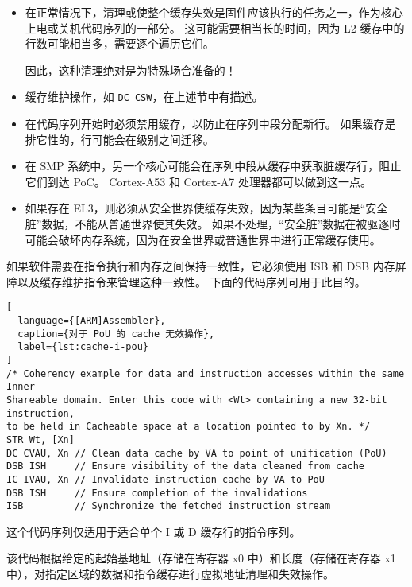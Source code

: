 \begin{itemize}
  \item 在正常情况下，清理或使整个缓存失效是固件应该执行的任务之一，作为核心上电或关机代码序列的一部分。
  这可能需要相当长的时间，因为 L2 缓存中的行数可能相当多，需要逐个遍历它们。

    因此，这种清理绝对是为特殊场合准备的！
  \item 缓存维护操作，如 \lstinline!DC CSW!，在上述节中有描述。
  \item 在代码序列开始时必须禁用缓存，以防止在序列中段分配新行。
  如果缓存是排它性的，行可能会在级别之间迁移。
  \item 在 SMP 系统中，另一个核心可能会在序列中段从缓存中获取脏缓存行，阻止它们到达 PoC。
  Cortex-A53 和 Cortex-A7 处理器都可以做到这一点。
  \item 如果存在 EL3，则必须从安全世界使缓存失效，因为某些条目可能是“安全脏”数据，不能从普通世界使其失效。
  如果不处理，“安全脏”数据在被驱逐时可能会破坏内存系统，因为在安全世界或普通世界中进行正常缓存使用。
\end{itemize}

如果软件需要在指令执行和内存之间保持一致性，它必须使用 ISB 和 DSB 内存屏障以及缓存维护指令来管理这种一致性。
下面的代码序列可用于此目的。

\begin{lstlisting}[
  language={[ARM]Assembler},
  caption={对于 PoU 的 cache 无效操作},
  label={lst:cache-i-pou}
]
/* Coherency example for data and instruction accesses within the same Inner
Shareable domain. Enter this code with <Wt> containing a new 32-bit instruction,
to be held in Cacheable space at a location pointed to by Xn. */
STR Wt, [Xn]
DC CVAU, Xn // Clean data cache by VA to point of unification (PoU)
DSB ISH     // Ensure visibility of the data cleaned from cache
IC IVAU, Xn // Invalidate instruction cache by VA to PoU
DSB ISH     // Ensure completion of the invalidations
ISB         // Synchronize the fetched instruction stream
\end{lstlisting}

这个代码序列仅适用于适合单个 I 或 D 缓存行的指令序列。

该代码根据给定的起始基地址（存储在寄存器 x0 中）和长度（存储在寄存器 x1 中），对指定区域的数据和指令缓存进行虚拟地址清理和失效操作。

